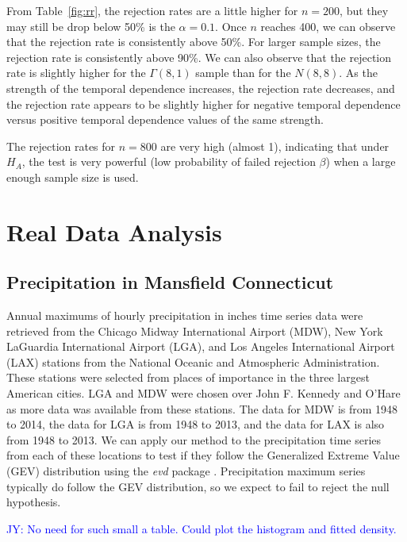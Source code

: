 \documentclass[12pt, titlepage, letterpaper]{article}
\newcommand{\jy}[1]{\textcolor{blue}{JY: #1}}
\newcommand{\mc}[1]{\textcolor{green}{MC: (#1)}}
\begin{document}
{From 
Table~\ref{fig:rr}, 
the rejection rates are a little higher for $n = 200$, but they may still be 
drop below 50\% is the $\alpha = 0.1$. Once $n$ reaches 400, we can observe 
that the rejection rate
is consistently above 50\%. For larger sample sizes, the rejection rate is 
consistently above 90\%. We can also
observe that the rejection rate is slightly higher for the $\Gamma(8, 1)$ sample 
than for 
the $N(8, 8)$. As the strength of the temporal dependence increases, the 
rejection rate decreases, and the rejection
rate appears to be slightly higher for negative temporal dependence versus 
positive temporal dependence values of the same strength.


The rejection rates for $n = 800$
are very 
high (almost 1), indicating that under $H_A$, the test is very powerful 
(low probability of failed rejection $\beta$) when a large enough
sample size is used.


\section{Real Data Analysis}
\label{sec:real}

\subsection{Precipitation in Mansfield Connecticut}
\label{sec:precipitation}
Annual maximums of hourly precipitation in inches time series data were 
retrieved 
from the Chicago Midway International Airport (MDW), New York LaGuardia 
International 
Airport (LGA),
and Los Angeles International Airport (LAX) stations from the 
National Oceanic and Atmospheric Administration. These stations were selected 
from places of importance in the three largest American cities. LGA and
MDW were chosen over John F. Kennedy and O'Hare as more data was available
from these stations. The data for MDW is from
1948 to 2014, the data for LGA is from 1948 to 2013, and the
data for LAX is also from 1948 to 2013. We can apply our method to
the precipitation time series from each of these locations to test if they
follow the
Generalized Extreme Value (GEV) distribution using the \textsl{evd} 
package \citep{evd}. Precipitation maximum series 
typically do follow the GEV distribution, so we expect to fail to reject the
null hypothesis.

\jy{No need for such small a table. Could plot the histogram and fitted density.}



}
\end{document}
